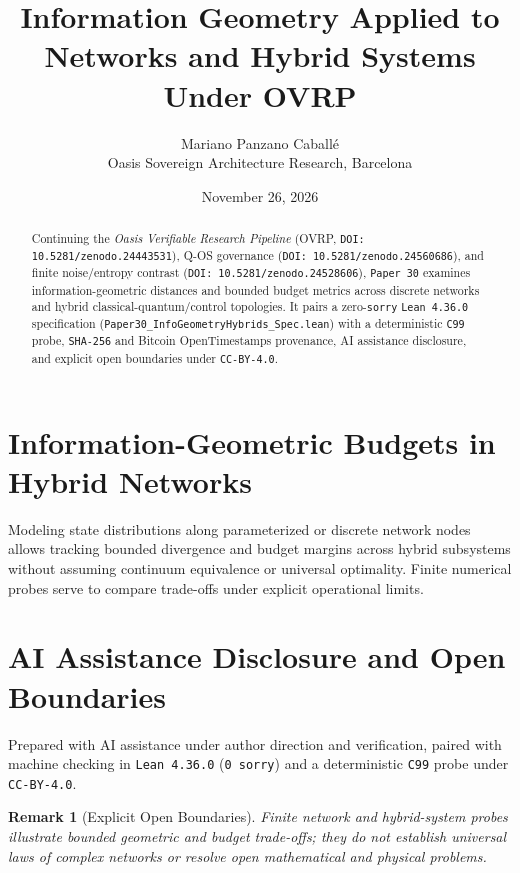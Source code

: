 \documentclass[11pt,a4paper]{article}
\title{Information Geometry Applied to Networks and Hybrid Systems Under OVRP}
\author{Mariano Panzano Caball\'e \\ \small Oasis Sovereign Architecture Research, Barcelona}
\date{November 26, 2026}
\newtheorem{remark}{Remark}
\begin{document}
\maketitle

\begin{abstract}
Continuing the \emph{Oasis Verifiable Research Pipeline} (OVRP, \texttt{DOI: 10.5281/zenodo.24443531}), Q-OS governance (\texttt{DOI: 10.5281/zenodo.24560686}), and finite noise/entropy contrast (\texttt{DOI: 10.5281/zenodo.24528606}), \texttt{Paper~30} examines information-geometric distances and bounded budget metrics across discrete networks and hybrid classical-quantum/control topologies. It pairs a zero-\texttt{sorry} \texttt{Lean~4.36.0} specification (\texttt{Paper30\_InfoGeometryHybrids\_Spec.lean}) with a deterministic \texttt{C99} probe, \texttt{SHA-256} and Bitcoin OpenTimestamps provenance, AI assistance disclosure, and explicit open boundaries under \texttt{CC-BY-4.0}.
\end{abstract}

\section{Information-Geometric Budgets in Hybrid Networks}
Modeling state distributions along parameterized or discrete network nodes allows tracking bounded divergence and budget margins across hybrid subsystems without assuming continuum equivalence or universal optimality. Finite numerical probes serve to compare trade-offs under explicit operational limits.

\section*{AI Assistance Disclosure and Open Boundaries}
Prepared with AI assistance under author direction and verification, paired with machine checking in \texttt{Lean~4.36.0} (\texttt{0~sorry}) and a deterministic \texttt{C99} probe under \texttt{CC-BY-4.0}.

\begin{remark}[Explicit Open Boundaries]
Finite network and hybrid-system probes illustrate bounded geometric and budget trade-offs; they do not establish universal laws of complex networks or resolve open mathematical and physical problems.
\end{remark}
\end{document}
